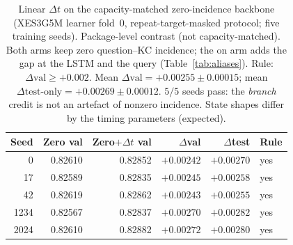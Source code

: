 \begin{table}[H]
\caption{Linear $\Delta t$ on the capacity-matched zero-incidence
backbone (XES3G5M learner fold~0, repeat-target-masked protocol; five
training seeds). Package-level contrast (not capacity-matched). Both
arms keep zero question--KC incidence; the on arm adds the gap at the
LSTM and the query (Table~\ref{tab:aliases}). Rule:
$\Delta\mathrm{val}\ge{+}0.002$. Mean
$\Delta\mathrm{val}{=}{+}0.00255{\pm}0.00015$; mean
$\Delta\mathrm{test\text{-}only}{=}{+}0.00269{\pm}0.00012$. $5/5$ seeds pass:
the \emph{branch} credit is not an artefact of nonzero incidence. State shapes
differ by the timing parameters (expected).}
\label{tab:qkc-zero-time}
\centering
\footnotesize
\begin{tabular}{@{}rrrrrl@{}}
\toprule
Seed & Zero val & Zero$+\Delta t$ val & $\Delta$val & $\Delta$test & Rule \\
\midrule
0 & 0.82610 & 0.82852 & $+0.00242$ & $+0.00270$ & yes \\
17 & 0.82589 & 0.82835 & $+0.00245$ & $+0.00258$ & yes \\
42 & 0.82619 & 0.82862 & $+0.00243$ & $+0.00255$ & yes \\
1234 & 0.82567 & 0.82837 & $+0.00270$ & $+0.00282$ & yes \\
2024 & 0.82610 & 0.82882 & $+0.00272$ & $+0.00280$ & yes \\
\bottomrule
\end{tabular}
\end{table}
